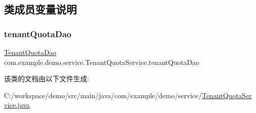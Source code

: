 \subsection{类成员变量说明}
\mbox{\label{classcom_1_1example_1_1demo_1_1service_1_1_tenant_quota_service_a5b93e7b30f321a4c5c01338bf127768e}} 
\subsubsection{\texorpdfstring{tenant\+Quota\+Dao}{tenantQuotaDao}}
{\footnotesize\ttfamily \mbox{\hyperlink{interfacecom_1_1example_1_1demo_1_1dao_1_1_tenant_quota_dao}{Tenant\+Quota\+Dao}} com.\+example.\+demo.\+service.\+Tenant\+Quota\+Service.\+tenant\+Quota\+Dao\hspace{0.3cm}{\ttfamily [package]}}



该类的文档由以下文件生成\+:\begin{DoxyCompactItemize}
\item 
C\+:/workspace/demo/src/main/java/com/example/demo/service/\mbox{\hyperlink{_tenant_quota_service_8java}{Tenant\+Quota\+Service.\+java}}\end{DoxyCompactItemize}
